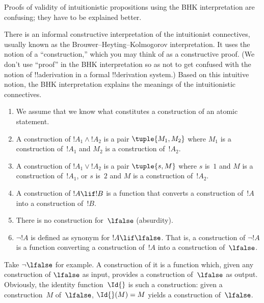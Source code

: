 \documentclass[../../../include/open-logic-section]{subfiles}
\begin{document}


\begin{editorial}
  Proofs of validity of intuitionistic propositions using the BHK
  interpretation are confusing; they have to be explained better.
\end{editorial}

There is an informal constructive interpretation of the intuitionist
connectives, usually known as the Brouwer--Heyting--Kolmogorov
interpretation. It uses the notion of a ``construction,'' which you
may think of as a constructive proof. (We don't use ``proof'' in the
BHK interpretation so as not to get confused with the notion of
!!a{derivation} in a formal !!{derivation} system.) Based on this intuitive
notion, the BHK interpretation explains the meanings of the
intuitionistic connectives.

\begin{enumerate}
\item We assume that we know what constitutes a construction of an atomic
  statement.
\item A construction of $!A_1 \land !A_2$ is a pair $\tuple{M_1, M_2}$
  where $M_1$ is a construction of~$!A_1$ and $M_2$ is a construction
  of~$!A_2$.
\item A construction of $!A_1 \lor !A_2$ is a pair $\tuple{s, M}$
  where $s$ is~$1$ and $M$ is a construction of~$!A_1$, or $s$ is~$2$
  and $M$ is a construction of~$!A_2$.
\item A construction of $!A \lif !B$ is a function that converts a
  construction of~$!A$ into a construction of~$!B$.
\item There is no construction for~$\lfalse$ (absurdity).
\item $\lnot !A$ is defined as synonym for $!A \lif \lfalse$. That is,
  a construction of $\lnot !A$ is a function converting a construction
  of~$!A$ into a construction of~$\lfalse$.
\end{enumerate}

\begin{ex}
Take $\lnot \lfalse$ for example. A construction of it is a function
which, given any construction of $\lfalse$ as input, provides a
construction of~$\lfalse$ as output. Obviously, the identity
function~$\Id{}$ is such a construction: given a construction~$M$
of~$\lfalse$, $\Id{}(M) = M$ yields a construction of~$\lfalse$.
\end{ex}
\end{document}
